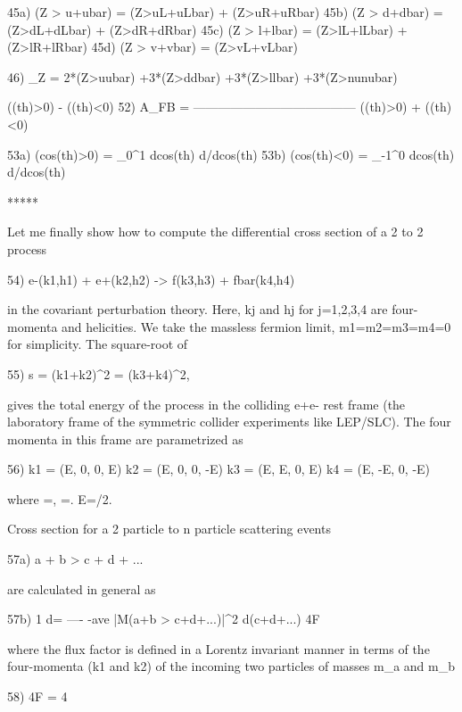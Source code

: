 \documentclass[12pt]{article}
\begin{document}
  45a) \Gamma(Z > u+ubar) = \Gamma(Z>uL+uLbar) + \Gamm(Z>uR+uRbar)
  45b) \Gamma(Z > d+dbar) = \Gamma(Z>dL+dLbar) + \Gamm(Z>dR+dRbar)
  45c) \Gamma(Z > l+lbar) = \Gamma(Z>lL+lLbar) + \Gamm(Z>lR+lRbar)
  45d) \Gamma(Z > v+vbar) = \Gamma(Z>vL+vLbar)

  46) \Gamma_Z = 2*\Gamma(Z>uubar)
                +3*\Gamma(Z>ddbar)
                +3*\Gamma(Z>llbar)
                +3*\Gamma(Z>nunubar)

              \Gamma(\cos(th)>0) - \Gamma(\cos(th)<0)
  52) A_FB =  ---------------------------------------
              \Gamma(\cos(th)>0) + \Gamma(\cos(th)<0)

  53a) \Gamma(cos(th)>0) = \Int_0^1  dcos(th) d\Gamma/dcos(th)
  53b) \Gamma(cos(th)<0) = \Int_-1^0 dcos(th) d\Gamma/dcos(th)

                              *****

  Let me finally show how to compute the differential cross section of
  a 2 to 2 process

  54) e-(k1,h1) + e+(k2,h2) -> f(k3,h3) + fbar(k4,h4)

  in the covariant perturbation theory.  Here, kj and hj for j=1,2,3,4
  are four-momenta and helicities.  We take the massless fermion limit,
  m1=m2=m3=m4=0 for simplicity.  The square-root of

  55) s = (k1+k2)^2 = (k3+k4)^2,

   gives the total energy of the process in the colliding e+e-
  rest frame (the laboratory frame of the symmetric collider experiments
  like LEP/SLC).  The four momenta in this frame are parametrized as

  56) k1 = (E,      0, 0,      E)
      k2 = (E,      0, 0,     -E)
      k3 = (E,  E\sth, 0,  E\cth)
      k4 = (E, -E\sth, 0, -E\cth)

  where \sth=\sin\theta, \cth=\cos\theta.  E=/2.

  Cross section for a 2 particle to n particle scattering events

  57a) a + b > c + d + ...

  are calculated in general as

  57b)       1
  d\sigma = ----  \Sum-ave  |M(a+b > c+d+...)|^2  d\PS(c+d+...)
             4F

  where the flux factor is defined in a Lorentz invariant manner in
  terms of the four-momenta (k1 and k2) of the incoming two particles
  of masses m_a and m_b

  58) 4F = 4 
\end{document}
